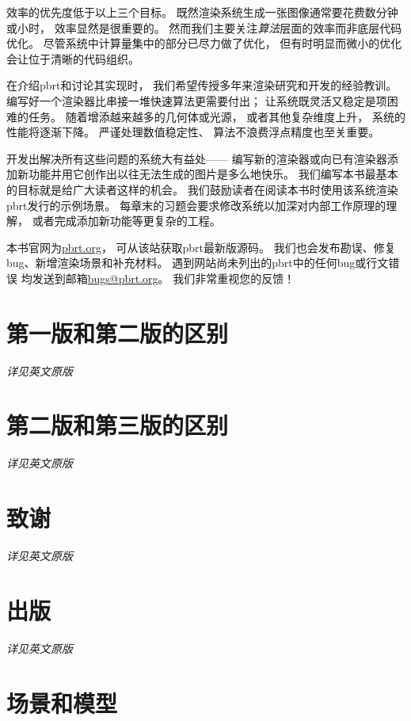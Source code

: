 效率的优先度低于以上三个目标。
既然渲染系统生成一张图像通常要花费数分钟或小时，
效率显然是很重要的。
然而我们主要关注{\itshape 算法}层面的效率而非底层代码优化。
尽管系统中计算量集中的部分已尽力做了优化，
但有时明显而微小的优化会让位于清晰的代码组织。

在介绍pbrt和讨论其实现时，
我们希望传授多年来渲染研究和开发的经验教训。
编写好一个渲染器比串接一堆快速算法更需要付出；
让系统既灵活又稳定是项困难的任务。
随着增添越来越多的几何体或光源，
或者其他复杂维度上升，
系统的性能将逐渐下降。
严谨处理数值稳定性、
算法不浪费浮点精度也至关重要。

开发出解决所有这些问题的系统大有益处——
编写新的渲染器或向已有渲染器添加新功能并用它创作出以往无法生成的图片是多么地快乐。
我们编写本书最基本的目标就是给广大读者这样的机会。
我们鼓励读者在阅读本书时使用该系统渲染pbrt发行的示例场景。
每章末的习题会要求修改系统以加深对内部工作原理的理解，
或者完成添加新功能等更复杂的工程。

本书官网为\href{www.pbrt.org}{\ttfamily pbrt.org}，
可从该站获取pbrt最新版源码。
我们也会发布勘误、修复bug、新增渲染场景和补充材料。
遇到网站尚未列出的pbrt中的任何bug或行文错误
均发送到邮箱\href{mailto:bugs@pbrt.org}{\url{bugs@pbrt.org}}。
我们非常重视您的反馈！

\section*{第一版和第二版的区别}\label{sec:第一版和第二版的区别}

{\itshape 详见英文原版}

\section*{第二版和第三版的区别}\label{sec:第二版和第三版的区别}

{\itshape 详见英文原版}

\section*{致谢}\label{sec:致谢}

{\itshape 详见英文原版}

\section*{出版}\label{sec:出版}

{\itshape 详见英文原版}

\section*{场景和模型}\label{sec:场景和模型}

